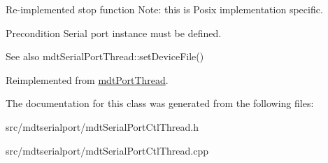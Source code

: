Re-\/implemented stop function Note: this is Posix implementation specific. 

\begin{DoxyPrecond}{Precondition}
Serial port instance must be defined. 
\end{DoxyPrecond}
\begin{DoxySeeAlso}{See also}
mdtSerialPortThread::setDeviceFile() 
\end{DoxySeeAlso}


Reimplemented from \hyperlink{classmdt_port_thread_a5746ea96689ed80179751ad1353f0b39}{mdtPortThread}.



The documentation for this class was generated from the following files:\begin{DoxyCompactItemize}
\item 
src/mdtserialport/mdtSerialPortCtlThread.h\item 
src/mdtserialport/mdtSerialPortCtlThread.cpp\end{DoxyCompactItemize}
